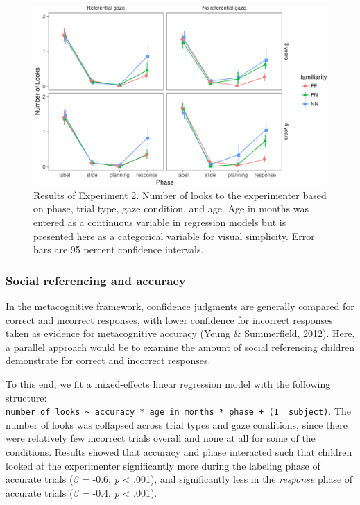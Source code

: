 \documentclass[english,man]{apa6}
\theoremstyle{definition}
\theoremstyle{definition}
\theoremstyle{definition}
\theoremstyle{remark}
\begin{document}
\begin{figure}[htbp]
\centering
\includegraphics{figs/resultse2-1.pdf}
\caption{\label{fig:resultse2}Results of Experiment 2. Number of looks to
the experimenter based on phase, trial type, gaze condition, and age.
Age in months was entered as a continuous variable in regression models
but is presented here as a categorical variable for visual simplicity.
Error bars are 95 percent confidence intervals.}
\end{figure}

\subsubsection{Social referencing and
accuracy}\label{social-referencing-and-accuracy}

In the metacognitive framework, confidence judgments are generally
compared for correct and incorrect responses, with lower confidence for
incorrect responses taken as evidence for metacognitive accuracy (Yeung
\& Summerfield, 2012). Here, a parallel approach would be to examine the
amount of social referencing children demonstrate for correct and
incorrect responses.

To this end, we fit a mixed-effects linear regression model with the
following structure:
\texttt{number\ of\ looks\ \textasciitilde{}\ accuracy\ *\ age\ in\ months\ *\ phase\ +\ (1\ \textbar{}\ subject)}.
The number of looks was collapsed across trial types and gaze
conditions, since there were relatively few incorrect trials overall and
none at all for some of the conditions. Results showed that accuracy and
phase interacted such that children looked at the experimenter
significantly more during the labeling phase of accurate trials
(\(\beta\) = -0.6, \emph{p} \textless{} .001), and significantly less in
the \emph{response} phase of accurate trials (\(\beta\) = -0.4, \emph{p}
\textless{} .001).
\end{document}
